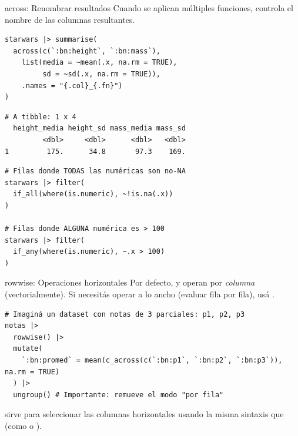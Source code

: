\documentclass[8pt]{beamer}
\begin{document}
\begin{frame}[fragile]{across: Renombrar resultados}
	Cuando se aplican múltiples funciones,  controla el nombre de las columnas resultantes.
\begin{lstlisting}[style=RScript]
starwars |> summarise(
  across(c(`:bn:height`, `:bn:mass`),
    list(media = ~mean(.x, na.rm = TRUE),
         sd = ~sd(.x, na.rm = TRUE)),
    .names = "{.col}_{.fn}")
)
\end{lstlisting}
\begin{lstlisting}[style=RConsole]
# A tibble: 1 x 4
  height_media height_sd mass_media mass_sd
         <dbl>     <dbl>      <dbl>   <dbl>
1         175.      34.8       97.3    169.
\end{lstlisting}

\begin{lstlisting}[style=RScript]
# Filas donde TODAS las numéricas son no-NA
starwars |> filter(
  if_all(where(is.numeric), ~!is.na(.x))
)

# Filas donde ALGUNA numérica es > 100
starwars |> filter(
  if_any(where(is.numeric), ~.x > 100)
)
\end{lstlisting}
\end{frame}






\begin{frame}[fragile]{rowwise: Operaciones horizontales}
	Por defecto,  y  operan por \emph{columna} (vectorialmente). Si necesitás operar a lo ancho (evaluar fila por fila), usá .
\begin{lstlisting}[style=RScript]
# Imaginá un dataset con notas de 3 parciales: p1, p2, p3
notas |> 
  rowwise() |> 
  mutate(
    `:bn:promed` = mean(c_across(c(`:bn:p1`, `:bn:p2`, `:bn:p3`)), na.rm = TRUE)
  ) |> 
  ungroup() # Importante: remueve el modo "por fila"
\end{lstlisting}

	\begin{alertblock}{}
		 sirve para seleccionar las columnas horizontales usando la misma sintaxis que  (como  o ).
	\end{alertblock}
\end{frame}
\end{document}
